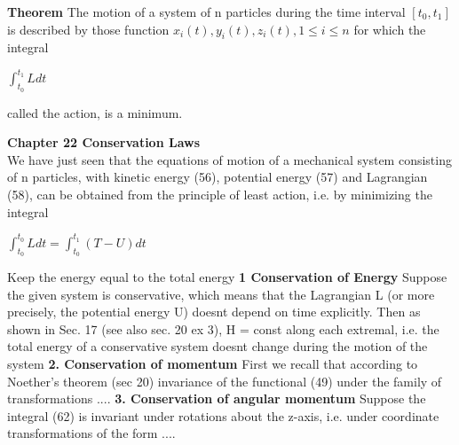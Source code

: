 \documentclass{article}
\begin{document}
\textbf {Theorem} The motion of a system of n particles during the time interval $[t_0, t_1]$ is described by those function $x_i (t), y_i(t), z_i(t), 1 \leq i \leq n$ for which the integral
\begin{center}
$\int_{t_0}^{t_1} L dt$
\end{center}
called the action, is a minimum.

\textbf {Chapter 22 Conservation Laws} \\ We have just seen that the equations of motion of a mechanical system consisting of n particles, with kinetic energy (56), potential energy (57) and Lagrangian (58), can be obtained from the principle of least action, i.e. by minimizing the integral
\begin{center}
$\int_{t_0}^{t_0} L dt = \int_{t_0}^{t_1} (T-U) dt$
\end{center}
Keep the energy equal to the total energy 
\textbf {1 Conservation of Energy} Suppose the given system is conservative, which means that the Lagrangian L (or more precisely, the potential energy U) doesnt depend on time explicitly. Then as shown in Sec. 17 (see also sec. 20 ex 3), H = const along each extremal, i.e. the total energy of a conservative system doesnt change during the motion of the system
\textbf {2. Conservation of momentum} First we recall that according to Noether's theorem (sec 20) invariance of the functional (49) under the family of transformations ....
\textbf {3. Conservation of angular momentum} Suppose the integral (62) is invariant under rotations about the z-axis, i.e. under coordinate transformations of the form ....
\end{document}
